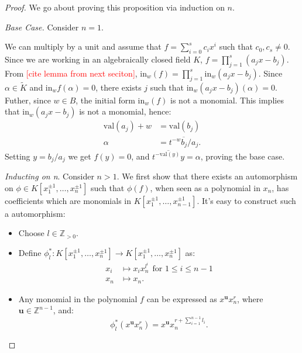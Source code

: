     \begin{proof}
        We go about proving this proposition via induction on $n$.
        \par \textit{Base Case.} Consider $n = 1$.
        \par We can multiply by a unit and assume that $f = \sum_{i=0}^{s}c_{i}x^{i}$ such that $c_{0}, c_{s}\neq0$. 
        Since we are working in an algebraically closed field $K$, $f = \prod^{s}_{j=1} (a_{j}x-b_{j})$. 
        From \textcolor{red}{[cite lemma from next seciton]}, $\text{in}_{w}(f) = \prod^{s}_{j=1} \text{in}_{w}(a_{j}x-b_{j})$. 
        Since $\alpha \in \tilde{K}$ and $\text{in}_{w}f(\alpha)=0$, there exists $j$ such that $\text{in}_{w}(a_{j}x-b_{j})(\alpha) = 0$.
        Futher, since $w \in B$, the initial form $\text{in}_{w}(f)$ is not a monomial.
        This implies that $\text{in}_{w}(a_{j}x-b_{j})$ is not a monomial, hence:
        \begin{align*}
            \text{val}(a_{j}) + w &= \text{val}(b_{j})\\
            \alpha &= \overline{t^{-w}b_{j}/a_{j}}.
        \end{align*}
        Setting $y = b_{j}/a_{j}$ we get $f(y) = 0$, and $\overline{t^{-\text{val}(y)}y} = \alpha$, proving the base case.
        \par \textit{Inducting on n}. Consider $n>1$.       
        We first show that there exists an automorphism on $\phi \in K[x_{1}^{\pm1}, \dots, x_{n}^{\pm1}]$ such that $\phi(f)$, when seen as a polynomial in $x_{n}$, has coefficients which are monomials in $ K[x_{1}^{\pm1}, \dots, x_{n-1}^{\pm1}]$. 
        It's easy to construct such a automorphism:
        \begin{itemize}
            \item Choose $l \in \mathbb{Z}_{>0}$.
            \item Define $\phi^{*}_{l}: K[x_{1}^{\pm1}, \dots, x_{n}^{\pm1}] \to  K[x_{1}^{\pm1}, \dots, x_{n}^{\pm1}]$ as:
                \begin{align*}
                    x_{i} &\mapsto x_{i}x_{n}^{l^{i}}~~\text{for }1\leq i\leq n-1\\
                    x_{n} &\mapsto x_{n}.
                \end{align*}
            \item Any monomial in the polynomial $f$ can be expressed as $x^{\textbf{u}}x_{n}^{r}$, where $\textbf{u} \in \mathbb{Z}^{n-1}$, and:
                \[
                    \phi^{*}_{l}(x^{\textbf{u}}x_{n}^{r}) = x^{\textbf{u}}x_{n}^{r+\sum_{i=1}^{n-1}l_{i}}.
\]
\end{itemize}
\end{proof}
